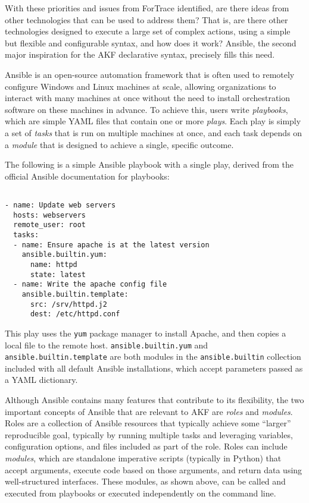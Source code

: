 With these priorities and issues from ForTrace identified, are there
ideas from other technologies that can be used to address them? That is,
are there other technologies designed to execute a large set of complex
actions, using a simple but flexible and configurable syntax, and how
does it work? Ansible, the second major inspiration for the AKF
declarative syntax, precisely fills this need.

Ansible is an open-source automation framework that is often used to
remotely configure Windows and Linux machines at scale, allowing
organizations to interact with many machines at once without the need to
install orchestration software on these machines in advance. To achieve
this, users write \emph{playbooks}, which are simple YAML files that
contain one or more \emph{plays}. Each play is simply a set of
\emph{tasks} that is run on multiple machines at once, and each task
depends on a \emph{module} that is designed to achieve a single,
specific outcome.

The following is a simple Ansible playbook with a single play, derived
from the official Ansible documentation for playbooks:

\begin{lstlisting}

- name: Update web servers
  hosts: webservers
  remote_user: root
  tasks:
  - name: Ensure apache is at the latest version
    ansible.builtin.yum:
      name: httpd
      state: latest
  - name: Write the apache config file
    ansible.builtin.template:
      src: /srv/httpd.j2
      dest: /etc/httpd.conf
\end{lstlisting}

This play uses the \passthrough{\lstinline!yum!} package manager to
install Apache, and then copies a local file to the remote host.
\passthrough{\lstinline!ansible.builtin.yum!} and
\passthrough{\lstinline!ansible.builtin.template!} are both modules in
the \passthrough{\lstinline!ansible.builtin!} collection included with
all default Ansible installations, which accept parameters passed as a
YAML dictionary.

Although Ansible contains many features that contribute to its
flexibility, the two important concepts of Ansible that are relevant to
AKF are \emph{roles} and \emph{modules}. Roles are a collection of
Ansible resources that typically achieve some ``larger'' reproducible
goal, typically by running multiple tasks and leveraging variables,
configuration options, and files included as part of the role. Roles can
include \emph{modules}, which are standalone imperative scripts
(typically in Python) that accept arguments, execute code based on those
arguments, and return data using well-structured interfaces. These
modules, as shown above, can be called and executed from playbooks or
executed independently on the command line.

